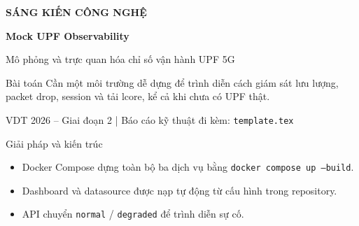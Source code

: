 \documentclass[aspectratio=169,11pt]{beamer}
\newcommand{\code}[1]{\texttt{#1}}
\begin{document}
\begin{frame}
\centering
{\Large\bfseries SÁNG KIẾN CÔNG NGHỆ}\vspace{0.5cm}

{\LARGE\bfseries Mock UPF Observability}\vspace{0.2cm}

{\large Mô phỏng và trực quan hóa chỉ số vận hành UPF 5G}\vspace{0.8cm}

\begin{block}{Bài toán}
Cần một môi trường dễ dựng để trình diễn cách giám sát lưu lượng, packet drop, session và tải lcore, kể cả khi chưa có UPF thật.
\end{block}
\vfill
{\small VDT 2026 -- Giai đoạn 2 \quad | \quad Báo cáo kỹ thuật đi kèm: \code{template.tex}}
\end{frame}

\begin{frame}{Giải pháp và kiến trúc}
\centering
{}
\vspace{0.7cm}
\begin{itemize}
\item Docker Compose dựng toàn bộ ba dịch vụ bằng \code{docker compose up --build}.
\item Dashboard và datasource được nạp tự động từ cấu hình trong repository.
\item API chuyển \code{normal} / \code{degraded} để trình diễn sự cố.
\end{itemize}
\end{frame}
\end{document}
